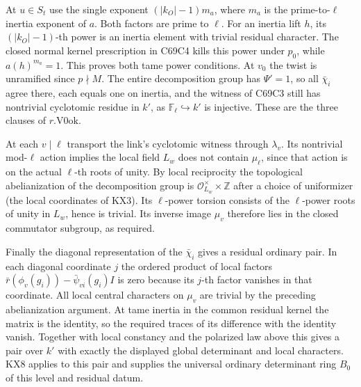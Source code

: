 At $u\in S_t$ use the single exponent $(|k_O|-1)m_a$, where $m_a$
is the prime-to-$\ell$ inertia exponent of $a$. Both factors are
prime to $\ell$. For an inertia lift $h$, its $(|k_O|-1)$-th
power is an inertia element with trivial residual character.
The closed normal kernel prescription in C69C4 kills this power
under $p_0$, while $a(h)^{m_a}=1$. This proves both tame power
conditions. At $v_0$ the twist is unramified since $p\nmid M$.
The entire decomposition group has $\Psi'=1$, so all
$\bar\chi_i$ agree there, each equals one on inertia, and the
witness of C69C3 still has nontrivial cyclotomic residue in $k'$,
as $\mathbb F_\ell\hookrightarrow k'$ is injective. These are the
three clauses of $r.\mathrm{V0ok}$.

At each $v\mid\ell$ transport the link's cyclotomic witness
through $\lambda_v$. Its nontrivial mod-$\ell$ action implies
the local field $L_w$ does not contain $\mu_\ell$, since that
action is on the actual $\ell$-th roots of unity. By local
reciprocity the topological abelianization of the decomposition
group is $\mathcal O_{L_w}^{\times}\times\widehat{\mathbb Z}$
after a choice of uniformizer (the local coordinates of KX3).
Its $\ell$-power torsion consists of the $\ell$-power roots of
unity in $L_w$, hence is trivial. Its inverse image $\mu_v$
therefore lies in the closed commutator subgroup, as required.

Finally the diagonal representation of the $\bar\chi_i$ gives a
residual ordinary pair. In each diagonal coordinate $j$ the ordered
product of local factors $\bar r(\phi_v(g_i))-\bar\psi_{vi}(g_i)I$
is zero because its $j$-th factor vanishes in that coordinate.
All local central characters on $\mu_v$ are trivial by the preceding
abelianization argument. At tame inertia in the common residual
kernel the matrix is the identity, so the required traces of its
difference with the identity vanish. Together with local constancy
and the polarized law above this gives a pair over $k'$ with exactly
the displayed global determinant and local characters. KX8 applies
to this pair and supplies the universal ordinary determinant ring
$B_0$ of this level and residual datum.

